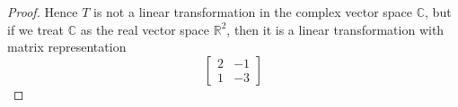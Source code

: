 \documentclass{article}
\begin{document}
\begin{proof}
    \medskip

    Hence $T$ is not a linear transformation in the complex vector space $\mathbb{C}$, but if we treat 
    $\mathbb{C}$ as the real vector space $\mathbb{R}^2$, then it is a linear transformation with matrix 
    representation 
    \[
    \begin{bmatrix}
        2 & -1 \\
        1 & -3
    \end{bmatrix}
    \]
\end{proof}
\end{document}
